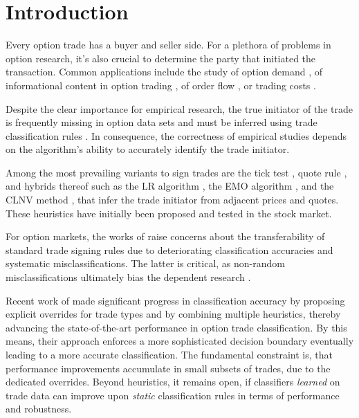 \section{Introduction}\label{sec:introduction}

Every option trade has a buyer and seller side. For a plethora of problems in option research, it’s also crucial to determine the party that initiated the transaction. Common applications include the study of option demand \autocite[][4261]{garleanuDemandBasedOptionPricing2009}, of informational content in option trading \autocites[][631]{huDoesOptionTrading2014}[][882]{panInformationOptionVolume2006}[][1079]{caoInformationalContentOption2005}, of order flow \autocite[][684]{muravyevOrderFlowExpected2016}, or trading costs \autocite[][4980]{muravyevOptionsTradingCosts2020}. 

Despite the clear importance for empirical research, the true initiator of the trade is frequently missing in option data sets and must be inferred using trade classification rules \autocite[][453]{easleyOptionVolumeStock1998}. In consequence, the correctness of empirical studies depends on the algorithm's ability to accurately identify the trade initiator.

Among the most prevailing variants to sign trades are the tick test \autocite[][240]{hasbrouckTradesQuotesInventories1988}, quote rule \autocite[][41]{harrisDayEndTransactionPrice1989}, and hybrids thereof such as the \gls{LR} algorithm \autocite[][745]{leeInferringTradeDirection1991}, the \gls{EMO} algorithm \autocite[][536]{ellisAccuracyTradeClassification2000}, and the \gls{CLNV} method \autocite[][3812]{chakrabartyTradeClassificationAlgorithms2007}, that infer the trade initiator from adjacent prices and quotes. These heuristics have initially been proposed and tested in the stock market.

For option markets, the works of \textcites[][11--13]{grauerOptionTradeClassification2022}[][887--891]{savickasInferringDirectionOption2003} raise concerns about the transferability of standard trade signing rules due to deteriorating classification accuracies and systematic misclassifications. The latter is critical, as non-random misclassifications ultimately bias the dependent research \autocites[][260]{odders-whiteOccurrenceConsequencesInaccurate2000}[][157]{theissenTestAccuracyLee2001}.

Recent work of \textcite[][13--16]{grauerOptionTradeClassification2022} made significant progress in classification accuracy by proposing explicit overrides for trade types and by combining multiple heuristics, thereby advancing the state-of-the-art performance in option trade classification. By this means, their approach enforces a more sophisticated decision boundary eventually leading to a more accurate classification. The fundamental constraint is, that performance improvements accumulate in small subsets of trades, due to the dedicated overrides. Beyond heuristics, it remains open, if classifiers \emph{learned} on trade data can improve upon \emph{static} classification rules in terms of performance and robustness.

